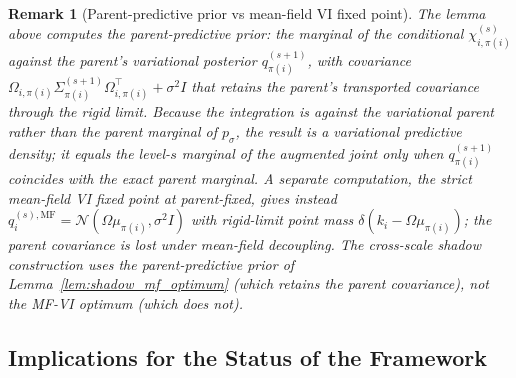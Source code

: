 \documentclass[11pt]{article}
\newtheorem{remark}{Remark}
\begin{document}
\begin{remark}[Parent-predictive prior vs mean-field VI fixed point]
\label{rem:shadow_marginal_vs_mf}
The lemma above computes the parent-predictive prior: the marginal of the conditional $\chi_{i,\pi(i)}^{(s)}$ against the parent's variational posterior $q_{\pi(i)}^{(s+1)}$, with covariance $\Omega_{i,\pi(i)} \Sigma_{\pi(i)}^{(s+1)} \Omega_{i,\pi(i)}^\top + \sigma^2 I$ that retains the parent's transported covariance through the rigid limit. Because the integration is against the variational parent rather than the parent marginal of $p_\sigma$, the result is a variational predictive density; it equals the level-$s$ marginal of the augmented joint only when $q_{\pi(i)}^{(s+1)}$ coincides with the exact parent marginal. A separate computation, the strict mean-field VI fixed point at parent-fixed, gives instead $q_i^{(s),\mathrm{MF}} = \mathcal{N}(\Omega \mu_{\pi(i)}, \sigma^2 I)$ with rigid-limit point mass $\delta(k_i - \Omega \mu_{\pi(i)})$; the parent covariance is lost under mean-field decoupling. The cross-scale shadow construction uses the parent-predictive prior of Lemma~\ref{lem:shadow_mf_optimum} (which retains the parent covariance), not the MF-VI optimum (which does not).
\end{remark}

\subsection{Implications for the Status of the Framework}
\end{document}

